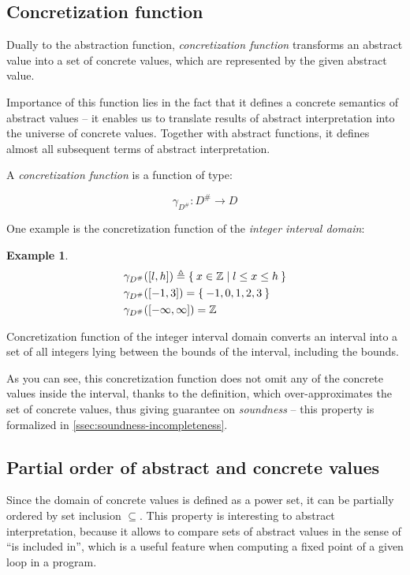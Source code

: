 \documentclass[12pt,oneside]{fithesis2}
\theoremstyle{definition}
\newtheorem{exmp}{Example}[section]
\begin{document}
\subsection{Concretization function}
Dually to the abstraction function, \textit{concretization function} transforms an abstract value into a set of concrete values, which are represented by the given abstract value.

Importance of this function lies in the fact that it defines a concrete semantics of abstract values -- it enables us to translate results of abstract interpretation into the universe of concrete values. Together with abstract functions, it defines almost all subsequent terms of abstract interpretation.

A \textit{concretization function} is a function of type:

\[
\gamma_{D^\#}\colon D^\# \to D
\]

One example is the concretization function of the \textit{integer interval domain}:

\begin{exmp}
  \begin{align*}
    &\gamma_{D^\#}([l,h]) \triangleq \Set{x \in \mathbb Z | l \le x \le h}\\
    &\gamma_{D^\#}([-1,3]) = \Set{-1, 0, 1, 2, 3}\\
    &\gamma_{D^\#}([-\infty, \infty]) = \mathbb Z
  \end{align*}
\end{exmp}

Concretization function of the integer interval domain converts an interval into a set of all integers lying between the bounds of the interval, including the bounds.

As you can see, this concretization function does not omit any of the concrete values inside the interval, thanks to the definition, which over-approximates the set of concrete values, thus giving guarantee on \textit{soundness} -- this property is formalized in \ref{ssec:soundness-incompleteness}.

\subsection{Partial order of abstract and concrete values}

Since the domain of concrete values is defined as a power set, it can be partially ordered by set inclusion $\subseteq$. This property is interesting to abstract interpretation, because it allows to compare sets of abstract values in the sense of ``is included in'', which is a useful feature when computing a fixed point of a given loop in a program.
\end{document}
